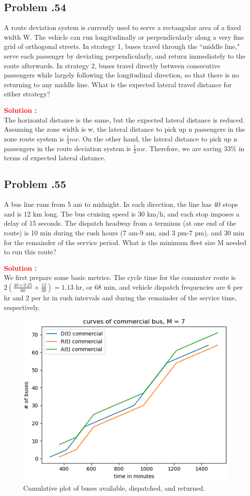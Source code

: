 \documentclass[12pt]{article}
\newcommand{\customsubsection}[1]{
  \subsection*{Problem \thesection.#1}
}
\begin{document}
\customsubsection{54}
A route deviation system is currently used to serve a rectangular area of a fixed width W. The vehicle can run longitudinally or perpendicularly along a very fine grid of orthogonal streets. In strategy 1, buses travel through the ``middle line," serve each passenger by deviating perpendicularly, and return immediately to the route afterwards. In strategy 2, buses travel directly between consecutive passengers while largely following the longitudinal direction, so that there is no returning to any middle line. What is the expected lateral travel distance for either strategy? 


\textbf{\textcolor{red}{Solution :}} \\
The horizontal distance is the same, but the expected lateral distance is reduced. Assuming the zone width is w, the lateral distance to pick up n passengers in the zone route system is $\frac{1}{3}nw$. On the other hand, the lateral distance to pick up n passengers in the route deviation system is $\frac{1}{2}nw$. Therefore, we are saving 33\% in terms of expected lateral distance.
\newpage

\customsubsection{55}

A bus line runs from 5 am to midnight. In each direction, the line has 40 stops and is 12 km long. The bus cruising speed is 30 km/h, and each stop imposes a delay of 15 seconds. The dispatch headway from a terminus (at one end of the route) is 10 min during the rush hours (7 am-9 am, and 3 pm-7 pm), and 30 min for the remainder of the service period. What is the minimum fleet size M needed to run this route? 

\textbf{\textcolor{red}{Solution :}} \\
We first prepare some basic metrics. The cycle time for the commuter route is $2\left(\frac{40\times 0.25}{60}+\frac{12}{30}\right)=1.13 $ hr, or 68 min, and vehicle dispatch frequencies are 6 per hr and 2 per hr in rush intervals and during the remainder of the service time, respectively. 
\begin{figure}[h!]
    \centering
    \includegraphics[width=0.5\linewidth]{img/P10_55.png}
    \caption{Cumulative plot of buses available, dispatched, and returned.}
    \label{fig:P10_55}
\end{figure}
\end{document}
